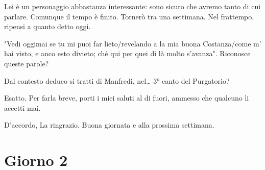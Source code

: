 \documentclass[a4paper,12pt]{article}
\newcommand{\Walter}{\speak{W}}
\newcommand{\Pollazzi}{\speak{P}}
\begin{document}
\begin{dialogue}
\Pollazzi Lei è un personaggio abbastanza interessante: sono sicuro che avremo tanto di cui parlare. Comunque il tempo è finito. Tornerò tra una settimana. Nel frattempo, ripensi a quanto detto oggi.

\Walter "Vedi oggimai se tu mi puoi far lieto/revelando a la mia buona Costanza/come m’ hai visto, e anco esto divieto; ché qui per quei di là molto s’avanza". Riconosce queste parole?

\Pollazzi Dal contesto deduco si tratti di Manfredi, nel… 3° canto del Purgatorio?

\Walter Esatto. Per farla breve, porti i miei saluti al di fuori, ammesso che qualcuno li accetti mai.

\Pollazzi D'accordo, La ringrazio. Buona giornata e alla prossima settimana.

\end{dialogue}

\pagebreak
\section*{Giorno 2}
\end{document}

